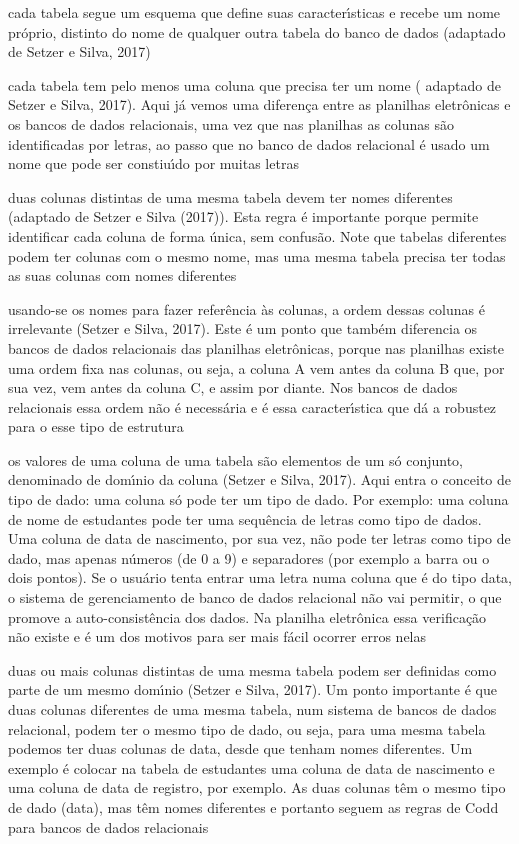 \documentclass[
12pt,		%
openright,	%
twoside,  %
a4paper,			%
chapter=TITLE,		%
english,			%
french,				%
spanish,			%
brazil				%
]{USPSC-classe/USPSC_RedarTex}
\begin{document}
\begin{alineas}
\item cada tabela segue um esquema que define suas caracter\'{\i}sticas e recebe um nome pr\'oprio, distinto do nome de qualquer outra tabela do banco de dados (adaptado de Setzer e Silva, 2017)
\item cada tabela tem pelo menos uma coluna que precisa ter um nome ( adaptado de Setzer e Silva, 2017). Aqui j\'a vemos uma diferen\c{c}a entre as planilhas eletr\^onicas e os bancos de dados relacionais, uma vez que nas planilhas as colunas s\~ao identificadas por letras, ao passo que no banco de dados relacional \'e usado um nome que pode ser constiu\'{\i}do por muitas letras
\item duas colunas distintas de uma mesma tabela devem ter nomes diferentes (adaptado de Setzer e Silva (2017)). Esta regra \'e importante porque permite identificar cada coluna de forma \'unica, sem confus\~ao. Note que tabelas diferentes podem ter colunas com o mesmo nome, mas uma mesma tabela precisa ter todas as suas colunas com nomes diferentes
\item usando-se os nomes para fazer refer\^encia \`as colunas, a ordem dessas colunas \'e irrelevante  (Setzer e Silva, 2017). Este \'e um ponto que tamb\'em diferencia os bancos de dados relacionais das planilhas eletr\^onicas, porque nas planilhas existe uma ordem fixa nas colunas, ou seja, a coluna A vem antes da coluna B que, por sua vez, vem antes da coluna C, e assim por diante. Nos bancos de dados relacionais essa ordem n\~ao \'e necess\'aria e \'e essa caracter\'{\i}stica que d\'a a robustez para o esse tipo de estrutura
\item os valores de uma coluna de uma tabela s\~ao elementos de um s\'o conjunto, denominado de dom\'{\i}nio da coluna  (Setzer e Silva, 2017). Aqui entra o conceito de tipo de dado: uma coluna s\'o pode ter um tipo de dado. Por exemplo: uma coluna de nome de estudantes pode ter uma sequ\^encia de letras como tipo de dados. Uma coluna de data de nascimento, por sua vez, n\~ao pode ter letras como tipo de dado, mas apenas n\'umeros (de 0 a 9) e separadores (por exemplo a barra ou o dois pontos). Se o usu\'ario tenta entrar uma letra numa coluna que \'e do tipo data, o sistema de gerenciamento de banco de dados relacional n\~ao vai permitir, o que promove a auto-consist\^encia dos dados. Na planilha eletr\^onica essa verifica\c{c}\~ao n\~ao existe e \'e um dos motivos para ser mais f\'acil ocorrer erros nelas
\item duas ou mais colunas distintas de uma mesma tabela podem ser definidas como parte de um mesmo dom\'{\i}nio  (Setzer e Silva, 2017). Um ponto importante \'e que duas colunas diferentes de uma mesma tabela, num sistema de bancos de dados relacional, podem ter o mesmo tipo de dado, ou seja, para uma mesma tabela podemos ter duas colunas de data, desde que tenham nomes diferentes. Um exemplo \'e colocar na tabela de estudantes uma coluna de data de nascimento e uma coluna de data de registro, por exemplo. As duas colunas t\^em o mesmo tipo de dado (data), mas t\^em nomes diferentes e portanto seguem as regras de Codd para bancos de dados relacionais

\end{alineas}
\end{document}
